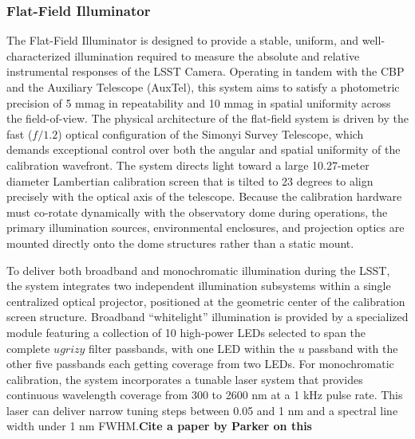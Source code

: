 \subsubsection{Flat-Field Illuminator}\label{sec:data:calsys:flat_field_illuminator}

The Flat-Field Illuminator is designed to provide a stable, uniform, and well-characterized illumination required to measure the absolute and relative instrumental responses of the LSST Camera. Operating in tandem with the CBP and the Auxiliary Telescope (AuxTel), this system aims to satisfy a photometric precision of 5 mmag in repeatability and 10 mmag in spatial uniformity across the field-of-view.  The physical architecture of the flat-field system is driven by the fast ($f/1.2$) optical configuration of the Simonyi Survey Telescope, which demands exceptional control over both the angular and spatial uniformity of the calibration wavefront. The system directs light toward a large 10.27-meter diameter Lambertian calibration screen that is tilted to 23 degrees to align precisely with the optical axis of the telescope. Because the calibration hardware must co-rotate dynamically with the observatory dome during operations, the primary illumination sources, environmental enclosures, and projection optics are mounted directly onto the dome structures rather than a static mount.

To deliver both broadband and monochromatic illumination during the LSST, the system integrates two independent illumination subsystems within a single centralized optical projector, positioned at the geometric center of the calibration screen structure. Broadband ``whitelight'' illumination is provided by a specialized module featuring a collection of 10 high-power LEDs selected to span the complete $ugrizy$ filter passbands, with one LED within the $u$ passband with the other five passbands each getting coverage from two LEDs. For monochromatic calibration, the system incorporates a tunable laser system that provides continuous wavelength coverage from 300 to 2600 nm at a 1 kHz pulse rate. This laser can deliver narrow tuning steps between 0.05 and 1 nm and a spectral line width under 1 nm FWHM.\textbf{Cite a paper by Parker on this}

